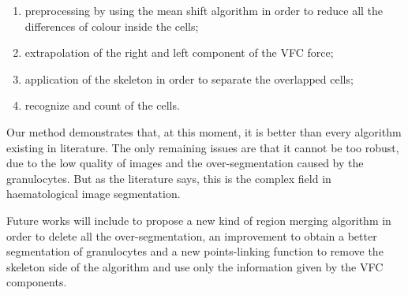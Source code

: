\begin{minipage}{\linewidth}
\begin{enumerate}
\item preprocessing by using the mean shift algorithm in order to reduce all the differences of colour inside the cells;
\item extrapolation of the right and left component of the VFC force;
\item application of the skeleton in order to separate the overlapped cells;
\item recognize and count of the cells.
\end{enumerate}
\end{minipage}

\bigskip

Our method demonstrates that, at this moment, it is better than every algorithm existing in literature. The only remaining issues are that it cannot be too robust, due to the low quality of images and the over-segmentation caused by the granulocytes. But as the literature says, this is the complex field in haematological image segmentation.

\bigskip

Future works will include to propose a new kind of region merging algorithm in order to delete all the over-segmentation,  an improvement to obtain a better segmentation of granulocytes and a new points-linking function to remove the skeleton side of the algorithm and use only the information given by the VFC components.